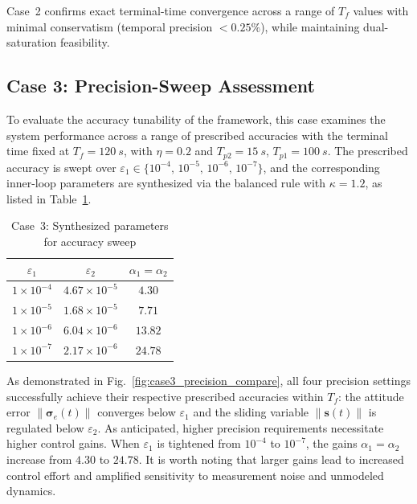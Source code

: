 \documentclass[journal]{new-aiaa}
\begin{document}
Case~2 confirms exact terminal-time convergence across a 
range of $T_f$ values with minimal conservatism (temporal precision $<0.25\%$), while maintaining dual-saturation 
feasibility.

\subsection{Case 3: Precision-Sweep Assessment}
\label{sec:case3_precision_sweep}
To evaluate the accuracy tunability of the framework, this case examines the system performance across a range of prescribed accuracies with the terminal time fixed at $T_f=\SI{120}{s}$, with $\eta=0.2$ and $T_{p2}=\SI{15}{s}$, $T_{p1}=\SI{100}{s}$.
The prescribed accuracy is swept over $\varepsilon_1\in\{10^{-4},\,10^{-5},\,10^{-6},\,10^{-7}\}$, and the corresponding inner-loop parameters are synthesized via the balanced rule with $\kappa=1.2$, as listed in Table~\ref{tab:case3_params}.

\begin{table}[htbp]
\centering
\caption{Case~3: Synthesized parameters for accuracy sweep}
\label{tab:case3_params}
\begin{tabular}{@{}c c c @{}}
\toprule
$\varepsilon_1$ & $\varepsilon_2$ & $\alpha_1=\alpha_2$  \\
\midrule
$1\times10^{-4}$ & $4.67\times10^{-5}$ & $4.30$ \\
$1\times10^{-5}$ & $1.68\times10^{-5}$ & $7.71$ \\
$1\times10^{-6}$ & $6.04\times10^{-6}$ & $13.82$ \\
$1\times10^{-7}$ & $2.17\times10^{-6}$ & $24.78$ \\
\bottomrule
\end{tabular}
\end{table}

As demonstrated in Fig.~\ref{fig:case3_precision_compare}, all four precision settings successfully achieve their respective prescribed accuracies within $T_f$: the attitude error $\|\boldsymbol{\sigma}_e(t)\|$ converges below $\varepsilon_1$ and the sliding variable $\|\boldsymbol{s}(t)\|$ is regulated below $\varepsilon_2$.
As anticipated, higher precision requirements necessitate higher control gains. When $\varepsilon_1$ is tightened from $10^{-4}$ to $10^{-7}$, the gains $\alpha_1=\alpha_2$ increase from $4.30$ to $24.78$.
It is worth noting that larger gains lead to increased control effort and amplified sensitivity to measurement noise and unmodeled dynamics.
\end{document}
